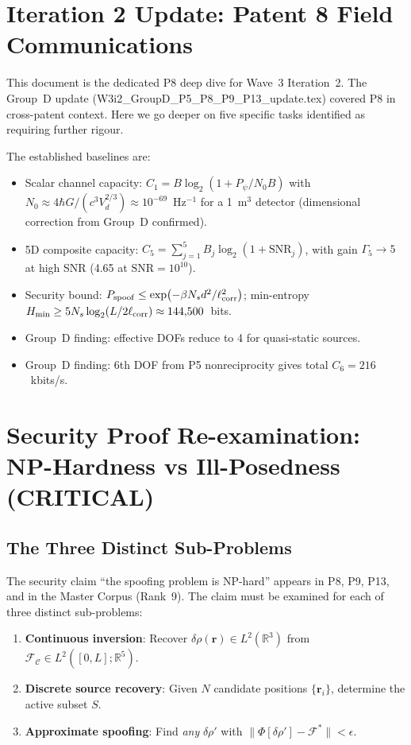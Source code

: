 \documentclass[aps,prd,twocolumn,superscriptaddress,nofootinbib]{revtex4-2}
\newcommand{\SNR}{\mathrm{SNR}}
\newcommand{\Hmin}{H_{\min}}
\newcommand{\Corridor}{\mathcal{C}}
\newcommand{\Fingerprint}{\mathcal{F}}
\begin{document}
\section{Iteration 2 Update: Patent 8 Field Communications}

This document is the dedicated P8 deep dive for Wave~3 Iteration~2.
The Group~D update (W3i2\_GroupD\_P5\_P8\_P9\_P13\_update.tex) covered
P8 in cross-patent context. Here we go deeper on five specific tasks
identified as requiring further rigour.

The established baselines are:
\begin{itemize}
\item Scalar channel capacity: $C_1 = B\log_2(1 + P_\psi/N_0 B)$ with
$N_0 \approx 4\hbar G/(c^3 V_d^{2/3}) \approx 10^{-69}$~Hz$^{-1}$
for a 1~m$^3$ detector (dimensional correction from Group~D confirmed).
\item 5D composite capacity: $C_5 = \sum_{j=1}^5 B_j\log_2(1+\SNR_j)$,
with gain $\Gamma_5 \to 5$ at high SNR (4.65 at $\SNR=10^{10}$).
\item Security bound: $P_{\rm spoof} \leq \exp(-\beta N_s d^2/\ell_{\rm corr}^2)$;
min-entropy $\Hmin \geq 5 N_s \log_2(L/2\ell_{\rm corr}) \approx 144{,}500$~bits.
\item Group~D finding: effective DOFs reduce to 4 for quasi-static sources.
\item Group~D finding: 6th DOF from P5 nonreciprocity gives total $C_6 = 216$~kbits/s.
\end{itemize}

\section{Security Proof Re-examination: NP-Hardness vs Ill-Posedness
(CRITICAL)}
\label{sec:security}

\subsection{The Three Distinct Sub-Problems}

The security claim ``the spoofing problem is NP-hard'' appears in P8,
P9, P13, and in the Master Corpus (Rank~9). The claim must be examined
for each of three distinct sub-problems:
\begin{enumerate}
\item \textbf{Continuous inversion}: Recover $\delta\rho(\mathbf{r}) \in L^2(\mathbb{R}^3)$
from $\Fingerprint_\Corridor \in L^2([0,L];\mathbb{R}^5)$.
\item \textbf{Discrete source recovery}: Given $N$ candidate positions
$\{\mathbf{r}_i\}$, determine the active subset $S$.
\item \textbf{Approximate spoofing}: Find \emph{any} $\delta\rho'$ with
$\|\Phi[\delta\rho'] - \Fingerprint^*\| < \epsilon$.
\end{enumerate}
\end{document}
